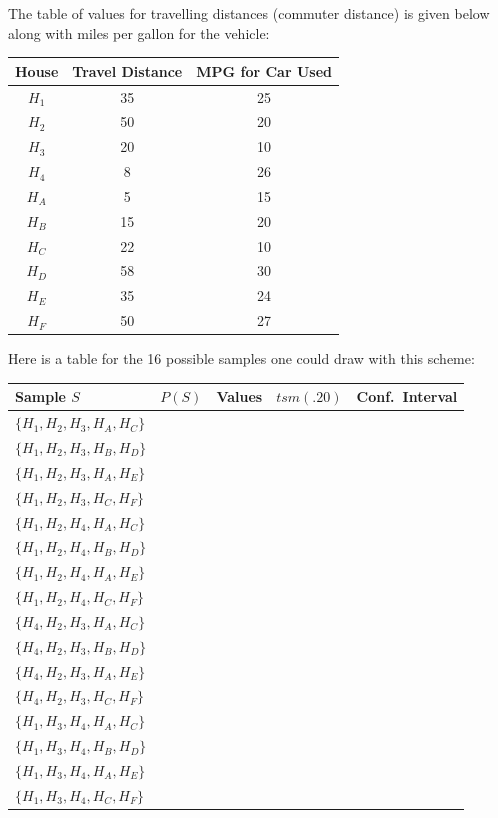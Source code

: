 \documentclass[12pt]{article}
\begin{document}
The table of values for travelling distances (commuter distance) is given below along with miles per gallon for the vehicle:

\begin{center}
\begin{tabular}{ccc}
\toprule
House & Travel Distance & MPG for Car Used \\
\midrule
$H_1$ & 35 & 25 \\
$H_2$ & 50 & 20 \\
$H_3$ & 20 & 10 \\
$H_4$ & 8 & 26 \\
$H_A$ & 5 & 15 \\
$H_B$ & 15 & 20 \\
$H_C$ & 22 & 10 \\
$H_D$ & 58 & 30 \\
$H_E$ & 35 & 24 \\
$H_F$ & 50 & 27 \\
\bottomrule
\end{tabular}
\end{center}

Here is a table for the 16 possible samples one could draw with this scheme:

\begin{center}
\begin{tabular}{lllll}
\toprule
Sample $S$ & $P(S)$ & Values & $tsm(.20)$ & Conf.\ Interval \\
\midrule
$\{H_1,H_2,H_3,H_A,H_C\}$ &  &  &  &  \\
$\{H_1,H_2,H_3,H_B,H_D\}$ &  &  &  &  \\
$\{H_1,H_2,H_3,H_A,H_E\}$ &  &  &  &  \\
$\{H_1,H_2,H_3,H_C,H_F\}$ &  &  &  &  \\
$\{H_1,H_2,H_4,H_A,H_C\}$ &  &  &  &  \\
$\{H_1,H_2,H_4,H_B,H_D\}$ &  &  &  &  \\
$\{H_1,H_2,H_4,H_A,H_E\}$ &  &  &  &  \\
$\{H_1,H_2,H_4,H_C,H_F\}$ &  &  &  &  \\
$\{H_4,H_2,H_3,H_A,H_C\}$ &  &  &  &  \\
$\{H_4,H_2,H_3,H_B,H_D\}$ &  &  &  &  \\
$\{H_4,H_2,H_3,H_A,H_E\}$ &  &  &  &  \\
$\{H_4,H_2,H_3,H_C,H_F\}$ &  &  &  &  \\
$\{H_1,H_3,H_4,H_A,H_C\}$ &  &  &  &  \\
$\{H_1,H_3,H_4,H_B,H_D\}$ &  &  &  &  \\
$\{H_1,H_3,H_4,H_A,H_E\}$ &  &  &  &  \\
$\{H_1,H_3,H_4,H_C,H_F\}$ &  &  &  &  \\
\bottomrule
\end{tabular}
\end{center}
\end{document}
